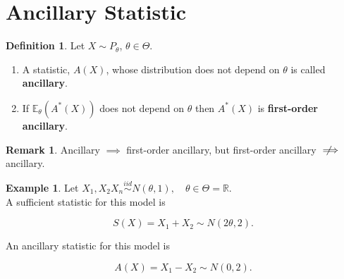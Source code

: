 \documentclass[12pt]{article}
\theoremstyle{definition}
\newtheorem*{definition}{Definition}
\newtheorem*{example}{Example}
\newtheorem*{remark}{Remark}
\newcommand{\notimplies}{%
  \mathrel{{\ooalign{\hidewidth$\not\phantom{=}$\hidewidth\cr$\implies$}}}}
\begin{document}
\section{Ancillary Statistic}

\begin{definition}
Let $X \sim P_{\theta}$, $\theta \in \Theta$.
\begin{enumerate}[label = (\arabic*)]

\item A statistic, $A(X)$, whose distribution does not depend on $\theta$
is called \textbf{ancillary}.

\item If $\mathbb{E}_{\theta}(A^{*}(X))$ does not depend on $\theta$ then
$A^{*}(X)$ is \textbf{first-order ancillary}.
\end{enumerate}
\end{definition}

\begin{remark}
Ancillary $\implies$ first-order ancillary, but first-order ancillary
$\notimplies$ ancillary.
\end{remark}

\begin{example}
Let $X_1, X_2 X_n \overset{iid}{\sim} N(\theta, 1), \quad \theta \in \Theta = \mathbb{R}$.\\

A sufficient statistic for this model is
 
$$ S(X) = X_1 + X_2 \sim N(2\theta, 2). $$

An ancillary statistic for this model is 

$$ A(X) = X_1 - X_2 \sim N(0, 2). $$
\end{example}
\end{document}
